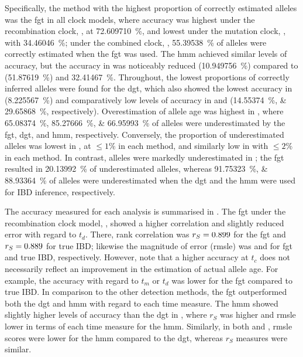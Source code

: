 Specifically, the method with the highest proportion of correctly estimated alleles was the \gls{fgt} in all  clock models, where accuracy was highest under the recombination clock, \ClockR, at \SI{72.609710}{\percent}, and lowest under the mutation clock, \ClockM, with \SI{34.46046}{\percent}; under the combined clock, \ClockC, \SI{55.39538}{\percent} of alleles were correctly estimated when the \gls{fgt} was used.
The \gls{hmm} achieved similar levels of accuracy, but the accuracy in \ClockR was noticeably reduced
(\SI{10.949756}{\percent}) compared to \ClockC (\SI{51.87619}{\percent}) and \ClockM \SI{32.41467}{\percent}.
Throughout, the lowest proportions of correctly inferred alleles were found for the \gls{dgt}, which also showed the lowest accuracy in \ClockR (\SIlist{8.225567}{\percent}) and comparatively low levels of accuracy in \ClockM and \ClockC (\SIlist{14.55374;29.65868}{\percent}, respectively).
Overestimation of allele age was highest in \ClockM, where \SIlist{65.08374;85.27666;66.95993}{\percent} of alleles were underestimated by the \gls{fgt}, \gls{dgt}, and \gls{hmm}, respectively.
Conversely, the proportion of underestimated alleles was lowest in \ClockM, at ${\leq 1\%}$ in each method, and similarly low in \ClockC with ${\leq 2\%}$ in each method.
In contrast, alleles were markedly underestimated in \ClockR; the \gls{fgt} resulted in \SI{20.13992}{\percent} of underestimated alleles, whereas \SIlist{91.75323;88.93364}{\percent} of alleles were underestimated when the \gls{dgt} and the \gls{hmm} were used for IBD inference, respectively.

%

%

The accuracy measured for each analysis is summarised in .
The \gls{fgt} under the recombination clock model, \ClockR, showed a higher correlation and slightly reduced error with regard to $t_d$.
There, rank correlation was ${r_S = \dec{0.898918}}$ for the \gls{fgt} and ${r_S = \dec{0.888794}}$ for true IBD; likewise the magnitude of error (\gls{rmsle}) was  and  for \gls{fgt} and true IBD, respectively.
However, note that a higher accuracy at $t_c$ does not necessarily reflect an improvement in the estimation of actual allele age.
For example, the accuracy with regard to $t_m$ or $t_d$ was lower for the \gls{fgt} compared to true IBD.
In comparison to the other detection methods, the \gls{fgt} outperformed both the \gls{dgt} and \gls{hmm} with regard to each time measure.
The \gls{hmm} showed slightly higher levels of accuracy than the \gls{dgt} in \ClockR, where $r_S$ was higher and \gls{rmsle} lower in terms of each time measure for the \gls{hmm}.
Similarly, in both \ClockM and \ClockC, \gls{rmsle} scores were lower for the \gls{hmm} compared to the \gls{dgt}, whereas $r_S$ measures were similar.

